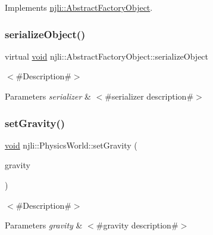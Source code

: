Implements \mbox{\hyperlink{classnjli_1_1_abstract_factory_object_aad2fbe86fb3bdecf02918a96b9c57976}{njli\+::\+Abstract\+Factory\+Object}}.

\mbox{\label{classnjli_1_1_physics_world_a4fc4bcd9d1930911474210c047372fc0}} 
\subsubsection{\texorpdfstring{serialize\+Object()}{serializeObject()}}
{\footnotesize\ttfamily virtual \mbox{\hyperlink{_thread_8h_af1e856da2e658414cb2456cb6f7ebc66}{void}} njli\+::\+Abstract\+Factory\+Object\+::serialize\+Object}

$<$\#\+Description\#$>$


\begin{DoxyParams}{Parameters}
{\em serializer} & $<$\#serializer description\#$>$ \\
\hline
\end{DoxyParams}
\mbox{\label{classnjli_1_1_physics_world_a55433c9f9a854a45b2135d6e15423f8b}} 
\subsubsection{\texorpdfstring{set\+Gravity()}{setGravity()}}
{\footnotesize\ttfamily \mbox{\hyperlink{_thread_8h_af1e856da2e658414cb2456cb6f7ebc66}{void}} njli\+::\+Physics\+World\+::set\+Gravity (\begin{DoxyParamCaption}\item[{const bt\+Vector3 \&}]{gravity }\end{DoxyParamCaption})}

$<$\#\+Description\#$>$


\begin{DoxyParams}{Parameters}
{\em gravity} & $<$\#gravity description\#$>$ \\
\hline
\end{DoxyParams}
\mbox{\label{classnjli_1_1_physics_world_a087eb5f8d9f51cc476f12f1d10a3cb95}} 
